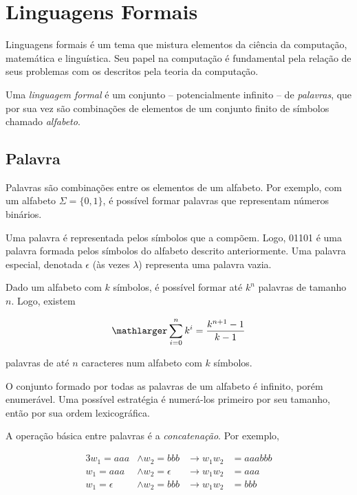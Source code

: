 \documentclass[a4paper,12pt,oneside,onecolumn]{uerj}
\begin{document}
\section{Linguagens Formais}

Linguagens formais é um tema que mistura elementos da ciência da computação, matemática e linguística. Seu papel na computação é fundamental pela relação de seus problemas com os descritos pela teoria da computação.

Uma \emph{linguagem formal} é um conjunto -- potencialmente infinito -- de \emph{palavras}, que por sua vez são combinações de elementos de um conjunto finito de símbolos chamado \emph{alfabeto}.

\subsection{Palavra}

Palavras são combinações entre os elementos de um alfabeto. Por exemplo, com um alfabeto $\Sigma = \{0, 1\}$, é possível formar palavras que representam números binários.

Uma palavra é representada pelos símbolos que a compõem. Logo, 01101 é uma palavra formada pelos símbolos do alfabeto descrito anteriormente. Uma palavra especial, denotada $\epsilon$ (às vezes $\lambda$) representa uma palavra vazia.

Dado um alfabeto com $k$ símbolos, é possível formar até $k^n$ palavras de tamanho $n$. Logo, existem

\begin{equation*}
	\mathlarger \sum^{n}_{i=0} k^i = \frac{k^{n+1}-1}{k-1}
\end{equation*}

palavras de até $n$ caracteres num alfabeto com $k$ símbolos.

O conjunto formado por todas as palavras de um alfabeto é infinito, porém enumerável. Uma possível estratégia é numerá-los primeiro por seu tamanho, então por sua ordem lexicográfica.

A operação básica entre palavras é a \emph{concatenação}. Por exemplo, 

\begin{alignat*}{3}
w_1 = aaa &\wedge w_2=bbb  &\rightarrow w_1w_2 &= aaabbb \\
w_1 = aaa &\wedge w_2=\epsilon  &\rightarrow w_1w_2 &= aaa \\
w_1 = \epsilon &\wedge w_2=bbb  &\rightarrow w_1w_2 &= bbb \\
\end{alignat*}
\end{document}

